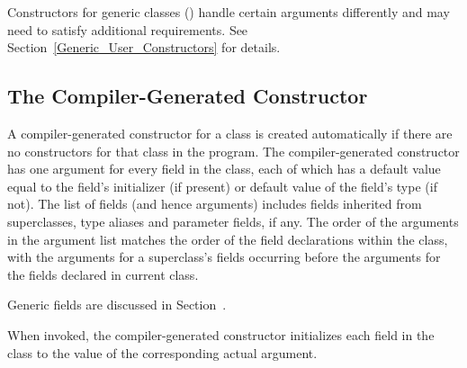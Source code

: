 Constructors for generic classes () handle certain
arguments differently and may need to satisfy additional
requirements. See Section~\ref{Generic_User_Constructors} for details.

\subsection{The Compiler-Generated Constructor}
\label{The_Compiler_Generated_Constructor}

A compiler-generated constructor for a class is created automatically
if there are no constructors for that class in the program.
The compiler-generated constructor has one argument for every field in the class,
each of which has a default value equal to the field's initializer (if present) or default value of the field's type (if not).
The list of fields (and hence arguments) includes fields inherited from superclasses, type aliases
and parameter fields, if any.
The order of the arguments in the argument list matches the order of the field declarations
within the class, with the arguments for a superclass's fields occurring
before the arguments for the fields declared in current class.

Generic fields are discussed in Section~.

When invoked, the compiler-generated constructor initializes each field in the class to the
value of the corresponding actual argument.  

%
%

